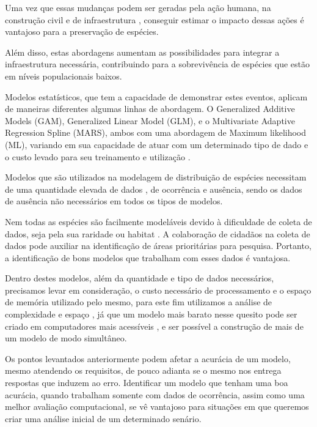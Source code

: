 \documentclass[
    12pt,               %
    openright,          %
    oneside,            %
    a4paper,            %
    english,            %
    brazil              %
    ]{abntex2}
\begin{document}
Uma vez que essas mudanças podem ser geradas pela ação humana, na construção civil e de infraestrutura 
\cite{impactConstruction}, conseguir estimar o impacto dessas ações é vantajoso para a preservação de espécies.

Além disso, estas abordagens aumentam as possibilidades para integrar a infraestrutura necessária, 
contribuindo para a sobrevivência de espécies que estão em níveis populacionais baixos.

Modelos estatísticos, que tem a capacidade de demonstrar estes eventos, aplicam de maneiras diferentes algumas 
linhas de abordagem. O Generalized Additive Models (GAM), Generalized Linear Model (GLM), e o 
Multivariate Adaptive Regression Spline (MARS), ambos com uma abordagem de Maximum likelihood (ML), 
variando em sua capacidade de atuar com um determinado tipo de dado e o custo levado para seu treinamento 
e utilização \cite{predPerform33models}.

Modelos que são utilizados na modelagem de distribuição de espécies necessitam de uma quantidade elevada de dados 
\cite{sampleSize}, de ocorrência e ausência, sendo os dados de ausência não necessários em todos os tipos de modelos.

Nem todas as espécies são facilmente modeláveis devido à dificuldade de coleta de dados, seja pela sua raridade ou habitat 
\cite{especiesDificies}. A colaboração de cidadãos na coleta de dados pode auxiliar na identificação de áreas prioritárias 
para pesquisa. Portanto, a identificação de bons modelos que trabalham com esses dados é vantajosa.

Dentro destes modelos, além da quantidade e tipo de dados necessários, precisamos levar em consideração, o custo necessário de 
processamento e o espaço de memória utilizado pelo mesmo, para este fim utilizamos a análise de complexidade 
e espaço \cite{introductionAlgorthms}, já que um modelo mais barato nesse quesito pode ser criado em computadores 
mais acessíveis \cite{introductionAnalysis}, e ser possível a construção de mais de um modelo de modo simultâneo.

Os pontos levantados anteriormente podem afetar a acurácia de um modelo, mesmo atendendo os requisitos, 
de pouco adianta se o mesmo nos entrega respostas que induzem ao erro. Identificar um modelo que tenham uma boa acurácia, 
quando trabalham somente com dados de ocorrência, assim como uma melhor avaliação computacional, se vê vantajoso para 
situações em que queremos criar uma análise inicial de um determinado senário.
\end{document}
